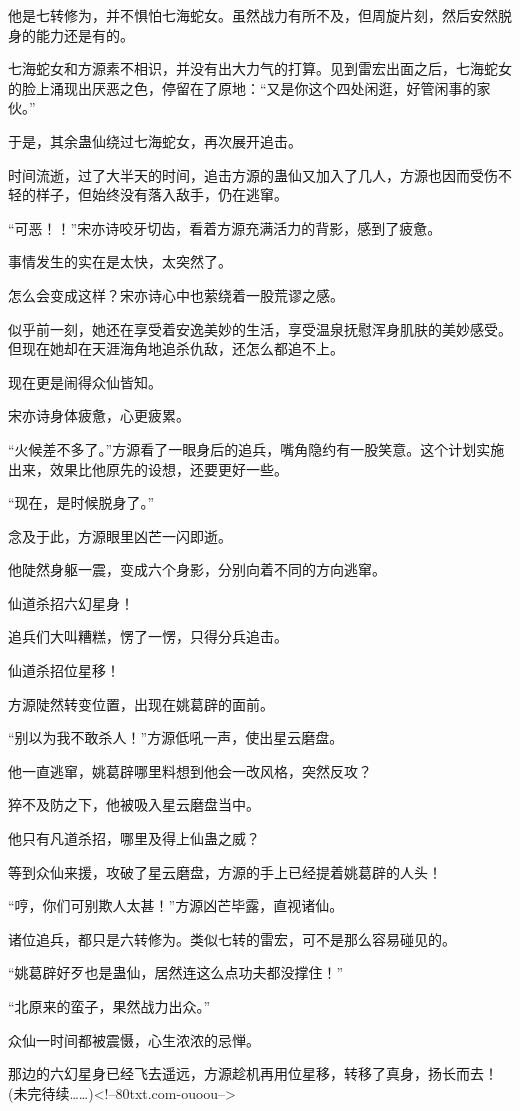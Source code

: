\begin{this_body}
他是七转修为，并不惧怕七海蛇女。虽然战力有所不及，但周旋片刻，然后安然脱身的能力还是有的。

七海蛇女和方源素不相识，并没有出大力气的打算。见到雷宏出面之后，七海蛇女的脸上涌现出厌恶之色，停留在了原地：“又是你这个四处闲逛，好管闲事的家伙。”

于是，其余蛊仙绕过七海蛇女，再次展开追击。

时间流逝，过了大半天的时间，追击方源的蛊仙又加入了几人，方源也因而受伤不轻的样子，但始终没有落入敌手，仍在逃窜。

“可恶！！”宋亦诗咬牙切齿，看着方源充满活力的背影，感到了疲惫。

事情发生的实在是太快，太突然了。

怎么会变成这样？宋亦诗心中也萦绕着一股荒谬之感。

似乎前一刻，她还在享受着安逸美妙的生活，享受温泉抚慰浑身肌肤的美妙感受。但现在她却在天涯海角地追杀仇敌，还怎么都追不上。

现在更是闹得众仙皆知。

宋亦诗身体疲惫，心更疲累。

“火候差不多了。”方源看了一眼身后的追兵，嘴角隐约有一股笑意。这个计划实施出来，效果比他原先的设想，还要更好一些。

“现在，是时候脱身了。”

念及于此，方源眼里凶芒一闪即逝。

他陡然身躯一震，变成六个身影，分别向着不同的方向逃窜。

仙道杀招六幻星身！

追兵们大叫糟糕，愣了一愣，只得分兵追击。

仙道杀招位星移！

方源陡然转变位置，出现在姚葛辟的面前。

“别以为我不敢杀人！”方源低吼一声，使出星云磨盘。

他一直逃窜，姚葛辟哪里料想到他会一改风格，突然反攻？

猝不及防之下，他被吸入星云磨盘当中。

他只有凡道杀招，哪里及得上仙蛊之威？

等到众仙来援，攻破了星云磨盘，方源的手上已经提着姚葛辟的人头！

“哼，你们可别欺人太甚！”方源凶芒毕露，直视诸仙。

诸位追兵，都只是六转修为。类似七转的雷宏，可不是那么容易碰见的。

“姚葛辟好歹也是蛊仙，居然连这么点功夫都没撑住！”

“北原来的蛮子，果然战力出众。”

众仙一时间都被震慑，心生浓浓的忌惮。

那边的六幻星身已经飞去遥远，方源趁机再用位星移，转移了真身，扬长而去！(未完待续……)<!--80txt.com-ouoou-->

\end{this_body}

